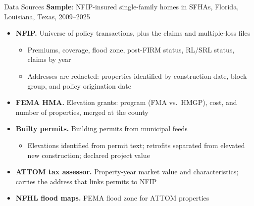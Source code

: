 \documentclass[serif, aspectratio=169, 10pt]{beamer}
\begin{document}
\begin{frame}[label=data_sources]{Data Sources}
\textbf{Sample}: NFIP-insured single-family homes in SFHAs, Florida, Louisiana, Texas, 2009--2025
\begin{itemize}
    \item \textbf{NFIP.} Universe of policy transactions, plus the claims and multiple-loss files
    \begin{itemize}
        \item Premiums, coverage, flood zone, post-FIRM status, RL/SRL status, claims by year
        \item Addresses are redacted: properties identified by construction date, block group, and policy origination date
    \end{itemize}
    \item \textbf{FEMA HMA.} Elevation grants: program (FMA vs.\ HMGP), cost, and number of properties, merged at the county
    \item \textbf{Builty permits.} Building permits from municipal feeds \hyperlink{builty_appendix}{}
    \begin{itemize}
        \item Elevations identified from permit text; retrofits separated from elevated new construction; declared project value
    \end{itemize}
    \item \textbf{ATTOM tax assessor.} Property-year market value and characteristics; carries the address that links permits to NFIP
    \item \textbf{NFHL flood maps.} FEMA flood zone for ATTOM properties
\end{itemize}
\end{frame}
\end{document}
